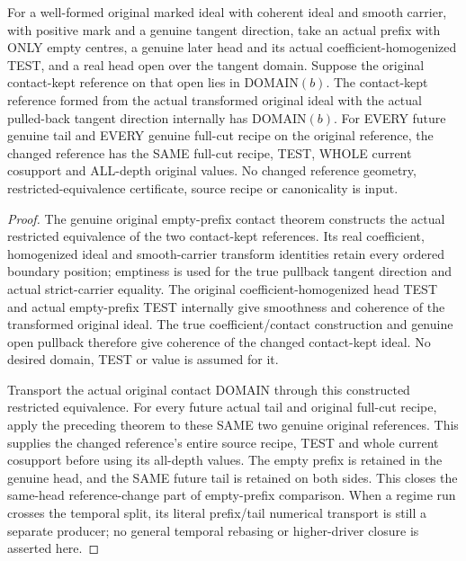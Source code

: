 \begin{theorem}
\label{hir:original-empty-prefix-contact-head-full-cut-transport}
\leanok
For a well-formed original marked ideal with coherent ideal and smooth carrier, with positive
mark and a genuine tangent direction, take an actual prefix with ONLY
empty centres, a genuine later head and its actual coefficient-homogenized
TEST, and a real head open over the tangent domain. Suppose the original
contact-kept reference on that open lies in DOMAIN$(b)$. The contact-kept
reference formed from the actual transformed original ideal with the
actual pulled-back tangent direction internally has DOMAIN$(b)$. For
EVERY future genuine tail and EVERY genuine full-cut recipe on the
original reference, the changed reference has the SAME full-cut recipe,
TEST, WHOLE current cosupport and ALL-depth original values. No changed
reference geometry, restricted-equivalence certificate, source recipe or
canonicality is input.
\end{theorem}
\begin{proof}
The genuine original empty-prefix contact theorem constructs the actual
restricted equivalence of the two contact-kept references. Its real
coefficient, homogenized ideal and smooth-carrier transform identities
retain every ordered boundary position; emptiness is used for the true
pullback tangent direction and actual strict-carrier equality. The original
coefficient-homogenized head TEST and actual empty-prefix TEST internally
give smoothness and coherence of the transformed original ideal. The true
coefficient/contact construction and genuine open pullback therefore give
coherence of the changed contact-kept ideal. No desired domain, TEST or
value is assumed for it.

Transport the actual original contact DOMAIN through this constructed
restricted equivalence. For every future actual tail and original full-cut
recipe, apply the preceding theorem to these SAME two genuine original
references. This supplies the changed reference's entire source recipe,
TEST and whole current cosupport before using its all-depth values. The
empty prefix is retained in the genuine head, and the SAME future tail is
retained on both sides. This closes the same-head reference-change part
of empty-prefix comparison. When a regime run crosses the temporal split,
its literal prefix/tail numerical transport is still a separate producer;
no general temporal rebasing or higher-driver closure is asserted here.
\end{proof}
